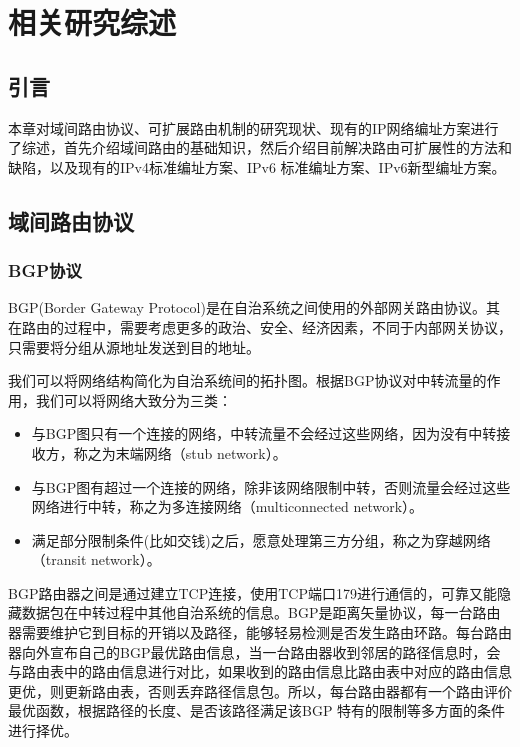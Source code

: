 

\chapter{相关研究综述}
\label{cha:review}

\section{引言}
本章对域间路由协议、可扩展路由机制的研究现状、现有的IP网络编址方案进行了综述，首先介绍域间路由的基础知识，然后介绍目前解决路由可扩展性的方法和缺陷，以及现有的IPv4标准编址方案、IPv6 标准编址方案、IPv6新型编址方案。

\section{域间路由协议}
\subsection{BGP协议}
BGP\cite{BGP}(Border Gateway Protocol)是在自治系统之间使用的外部网关路由协议。其在路由的过程中，需要考虑更多的政治、安全、经济因素，不同于内部网关协议，只需要将分组从源地址发送到目的地址。

我们可以将网络结构简化为自治系统间的拓扑图。根据BGP协议对中转流量的作用，我们可以将网络大致分为三类：

\begin{itemize}
\item 与BGP图只有一个连接的网络，中转流量不会经过这些网络，因为没有中转接收方，称之为末端网络（stub network）。
\item 与BGP图有超过一个连接的网络，除非该网络限制中转，否则流量会经过这些网络进行中转，称之为多连接网络（multiconnected network）。
\item 满足部分限制条件(比如交钱)之后，愿意处理第三方分组，称之为穿越网络（transit network）。
\end{itemize}

BGP路由器之间是通过建立TCP连接，使用TCP端口179进行通信的，可靠又能隐藏数据包在中转过程中其他自治系统的信息。BGP是距离矢量协议，每一台路由器需要维护它到目标的开销以及路径，能够轻易检测是否发生路由环路。每台路由器向外宣布自己的BGP最优路由信息，当一台路由器收到邻居的路径信息时，会与路由表中的路由信息进行对比，如果收到的路由信息比路由表中对应的路由信息更优，则更新路由表，否则丢弃路径信息包。所以，每台路由器都有一个路由评价最优函数，根据路径的长度、是否该路径满足该BGP 特有的限制等多方面的条件进行择优。

